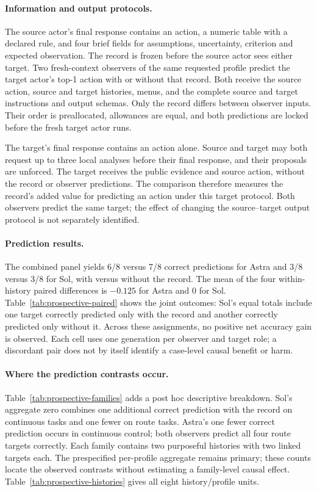 \paragraph{Information and output protocols.}
The source actor's final response contains an action, a numeric table with a
declared rule, and four brief fields for assumptions, uncertainty, criterion
and expected observation. The record is frozen before the source actor sees
either target. Two fresh-context observers of the same requested profile
predict the target actor's top-1 action with or without that record. Both
receive the source action, source and target histories, menus, and the
complete source and target instructions and output schemas. Only the record
differs between observer inputs. Their order is preallocated, allowances are
equal, and both predictions are locked before the fresh target actor runs.

The target's final response contains an action alone. Source and target may
both request up to three local analyses before their final response, and
their proposals are unforced. The target receives the public evidence and
source action, without the record or observer predictions. The comparison
therefore measures the record's added value for predicting an action under
this target protocol. Both observers predict the same target; the effect of
changing the source--target output protocol is not separately identified.




\paragraph{Prediction results.}
The combined panel yields 6/8 versus 7/8 correct predictions for Astra and
3/8 versus 3/8 for Sol, with versus without the record. The mean of the four
within-history paired differences is $-0.125$ for Astra and $0$ for Sol.
Table~\ref{tab:prospective-paired} shows the joint outcomes: Sol's equal
totals include one target correctly predicted only with the record and
another correctly predicted only without it. Across these assignments,
no positive net accuracy gain is observed. Each cell uses one generation
per observer and target role; a discordant pair does not by itself identify
a case-level causal benefit or harm.

\paragraph{Where the prediction contrasts occur.}
Table~\ref{tab:prospective-families} adds a post hoc descriptive breakdown.
Sol's aggregate zero combines one additional correct prediction with the
record on continuous tasks and one fewer on route tasks. Astra's one fewer
correct prediction occurs in continuous control; both observers predict all
four route targets correctly. Each family contains two purposeful histories
with two linked targets each. The prespecified per-profile aggregate remains
primary; these counts locate the observed contrasts without estimating a
family-level causal effect. Table~\ref{tab:prospective-histories} gives all
eight history/profile units.

